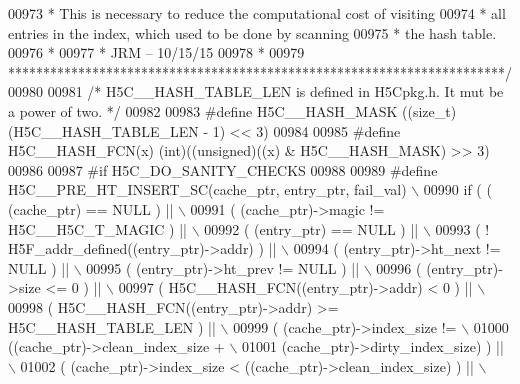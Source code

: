 \begin{DoxyCode}
00973 \textcolor{comment}{ *     This is necessary to reduce the computational cost of visiting}
00974 \textcolor{comment}{ *     all entries in the index, which used to be done by scanning }
00975 \textcolor{comment}{ *     the hash table.}
00976 \textcolor{comment}{ *}
00977 \textcolor{comment}{ *                                              JRM -- 10/15/15}
00978 \textcolor{comment}{ *}
00979 \textcolor{comment}{ ***********************************************************************/}
00980 
00981 \textcolor{comment}{/* H5C\_\_HASH\_TABLE\_LEN is defined in H5Cpkg.h.  It mut be a power of two. */}
00982 
00983 \textcolor{preprocessor}{#define H5C\_\_HASH\_MASK      ((size\_t)(H5C\_\_HASH\_TABLE\_LEN - 1) << 3)}
00984 
00985 \textcolor{preprocessor}{#define H5C\_\_HASH\_FCN(x)    (int)((unsigned)((x) & H5C\_\_HASH\_MASK) >> 3)}
00986 
00987 \textcolor{preprocessor}{#if H5C\_DO\_SANITY\_CHECKS}
00988 
00989 \textcolor{preprocessor}{#define H5C\_\_PRE\_HT\_INSERT\_SC(cache\_ptr, entry\_ptr, fail\_val)           \(\backslash\)}
00990 \textcolor{preprocessor}{if ( ( (cache\_ptr) == NULL ) ||                                         \(\backslash\)}
00991 \textcolor{preprocessor}{     ( (cache\_ptr)->magic != H5C\_\_H5C\_T\_MAGIC ) ||                      \(\backslash\)}
00992 \textcolor{preprocessor}{     ( (entry\_ptr) == NULL ) ||                                         \(\backslash\)}
00993 \textcolor{preprocessor}{     ( ! H5F\_addr\_defined((entry\_ptr)->addr) ) ||                       \(\backslash\)}
00994 \textcolor{preprocessor}{     ( (entry\_ptr)->ht\_next != NULL ) ||                                \(\backslash\)}
00995 \textcolor{preprocessor}{     ( (entry\_ptr)->ht\_prev != NULL ) ||                                \(\backslash\)}
00996 \textcolor{preprocessor}{     ( (entry\_ptr)->size <= 0 ) ||                                      \(\backslash\)}
00997 \textcolor{preprocessor}{     ( H5C\_\_HASH\_FCN((entry\_ptr)->addr) < 0 ) ||                        \(\backslash\)}
00998 \textcolor{preprocessor}{     ( H5C\_\_HASH\_FCN((entry\_ptr)->addr) >= H5C\_\_HASH\_TABLE\_LEN ) ||     \(\backslash\)}
00999 \textcolor{preprocessor}{     ( (cache\_ptr)->index\_size !=                                       \(\backslash\)}
01000 \textcolor{preprocessor}{       ((cache\_ptr)->clean\_index\_size +                                 \(\backslash\)}
01001 \textcolor{preprocessor}{    (cache\_ptr)->dirty\_index\_size) ) ||                             \(\backslash\)}
01002 \textcolor{preprocessor}{     ( (cache\_ptr)->index\_size < ((cache\_ptr)->clean\_index\_size) ) ||   \(\backslash\)}

\end{DoxyCode}
